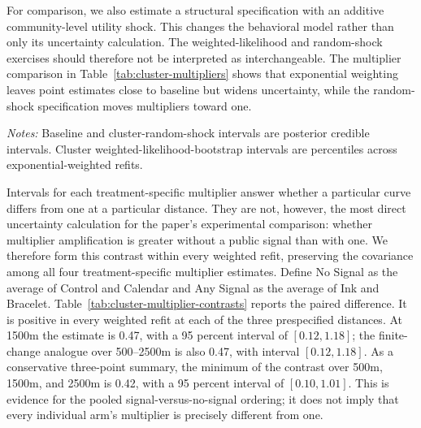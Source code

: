 \documentclass[12pt]{article}
\begin{document}
For comparison, we also estimate a structural specification with an additive
community-level utility shock. This changes the behavioral model rather than
only its uncertainty calculation. The weighted-likelihood and random-shock exercises
should therefore not be interpreted as interchangeable. The multiplier
comparison in Table~\ref{tab:cluster-multipliers} shows that exponential
weighting leaves point estimates close to baseline but widens uncertainty, while the
random-shock specification moves multipliers toward one.

\begin{table}[htbp]
  \centering
  \scriptsize
  \caption{Social multipliers under alternative treatments of community dependence}
  \label{tab:cluster-multipliers}
  
  \begin{minipage}{0.94\linewidth}
    \vspace{0.4em}\footnotesize
    \textit{Notes:} Baseline and cluster-random-shock intervals are posterior
    credible intervals. Cluster weighted-likelihood-bootstrap intervals are
    percentiles across exponential-weighted refits.
  \end{minipage}
\end{table}

Intervals for each treatment-specific multiplier answer whether a particular
curve differs from one at a particular distance. They are not, however, the
most direct uncertainty calculation for the paper's experimental comparison:
whether multiplier amplification is greater without a public signal than with
one. We therefore form this contrast within every weighted refit, preserving
the covariance among all four treatment-specific multiplier estimates. Define
No Signal as the average of Control and Calendar and Any Signal as the average
of Ink and Bracelet. Table~\ref{tab:cluster-multiplier-contrasts} reports the
paired difference. It is positive in every weighted refit at each of the three
prespecified distances. At 1500m the estimate is 0.47, with a 95 percent
interval of $[0.12,1.18]$; the finite-change analogue over 500--2500m is also
0.47, with interval $[0.12,1.18]$. As a conservative three-point summary, the minimum
of the contrast over 500m, 1500m, and 2500m is 0.42, with a 95 percent interval
of $[0.10,1.01]$. This is evidence for the pooled signal-versus-no-signal ordering; it
does not imply that every individual arm's multiplier is precisely different
from one.
\end{document}
